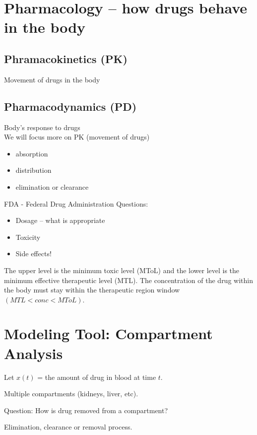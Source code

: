 \documentclass[
	date={September 9{,} 2024}
]{math486notes}
\begin{document}
\section{Pharmacology -- how drugs behave in the body}\label{sec:pharmacology}
\subsection{Phramacokinetics (PK)}\label{subsec:phramacokinetics-(pk)}
Movement of drugs in the body

\subsection{Pharmacodynamics (PD)}\label{subsec:pharmacodynamics-(pd)}
Body's response to drugs\\

We will focus more on PK (movement of drugs)
\begin{itemize}
	\item absorption
	\item distribution
	\item elimination or clearance
\end{itemize}

FDA - Federal Drug Administration
Questions:
\begin{itemize}
	\item Dosage -- what is appropriate
	\item Toxicity
	\item Side effects!
\end{itemize}

The upper level is the minimum toxic level (MToL) and the lower level is the minimum effective therapeutic level (MTL).
The concentration of the drug within the body must stay within the therapeutic region window $(MTL < conc < MToL)$.

\section{Modeling Tool: Compartment Analysis}\label{sec:modeling-tool:-compartment-analysis}
Let $x(t)$ = the amount of drug in blood at time $t$.

Multiple compartments (kidneys, liver, etc).

\begin{center}
	Question: How is drug removed from a compartment?
\end{center}
Elimination, clearance or removal process.
\end{document}
